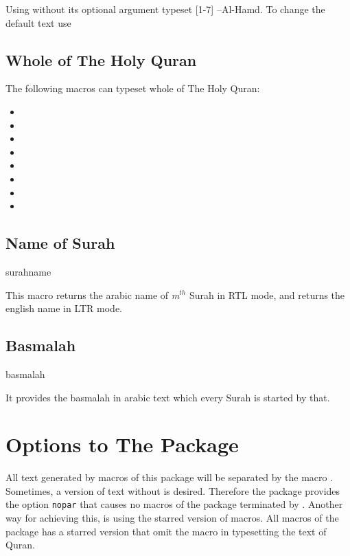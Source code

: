 \documentclass{ltxdoc}
\begin{document}
Using  without its optional argument typeset [1-7] --Al-Hamd. To
change the default text use 
\subsection{Whole of The Holy Quran}
The following macros can typeset whole of The Holy Quran:

\begin{itemize}
    \item {}
    \item {}
    \item {}
    \item {}
    \item {}
    \item {}
    \item {}
    \item {}
\end{itemize}

\subsection{Name of Surah}
\begin{declcs}{surahname}
\end{declcs}
This macro returns the arabic name of \textit{m}$^{th}$ Surah in RTL mode, and returns the 
english name in LTR mode.

\subsection{Basmalah}
\begin{declcs}{basmalah}
\end{declcs}
It provides the basmalah in arabic text which every Surah is started by that.

\section{Options to The Package}
All text generated by macros of this package will be separated by the macro . Sometimes, 
a version of text without  is desired. Therefore the package provides the option 
\texttt{nopar}
that causes no macros of the package terminated by .
Another way for achieving this, is using the starred version of macros. All macros of the package
has a starred version that omit the  macro in typesetting the text of Quran. 
\end{document}
